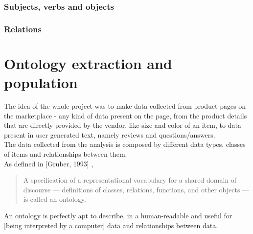 \documentclass[LaM,binding=0.6cm]{sapthesis}
\begin{document}
\subsection{Subjects, verbs and objects}

\subsection{Relations}

\chapter{Ontology extraction and population}

The idea of the whole project was to make data collected from product pages on the marketplace - any kind of data present on the page, from the product details that are directly provided by the vendor, like size and color of an item, to data present in user generated text, namely reviews and questions/answers.
\\
The data collected from the analysis is composed by different data types, classes of items and relationships between them.
\\
As defined in [Gruber, 1993] \cite{gruber_translation_1993}, 
\begin{quote}
A specification of a representational vocabulary for a shared domain of discourse — definitions of classes, relations, functions, and other objects — is called an ontology. 
\end{quote}

An ontology is perfectly apt to describe, in a human-readable and useful for [being interpreted by a computer] data and relationships between data.
\end{document}
